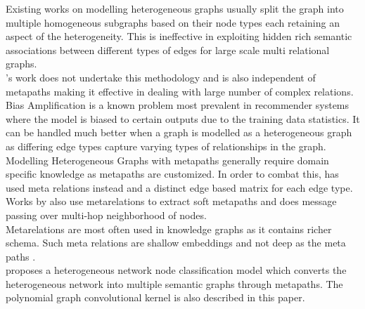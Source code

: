 \documentclass{report} %
\begin{document}
Existing works \cite{PR-HGNN-2024} on modelling heterogeneous graphs usually split the graph into multiple homogeneous subgraphs based on their node types each retaining an aspect of the heterogeneity.
This is ineffective in exploiting hidden rich semantic associations between different types of edges for large scale multi relational graphs. \\
\cite{RSHGNN-2019}'s work does not undertake this methodology and is also independent of metapaths making it effective in dealing with large number of complex relations.\\
Bias Amplification is a known problem most prevalent in recommender systems where the model is biased to certain outputs due to the training data statistics.
It can be handled much better when a graph  is modelled as a heterogeneous graph \cite{EV HGNN-2023} as differing edge types capture varying types of relationships in the graph. \\
Modelling Heterogeneous Graphs with metapaths generally require domain specific knowledge as metapaths are customized. 
In order to combat this, \cite{HGT-2022} has used meta relations instead and a distinct edge based matrix for each edge type.\\
Works by \cite{MHGNN-2023} also use metarelations to extract soft metapaths and does message passing over multi-hop neighborhood of nodes. \\
Metarelations are most often used in knowledge graphs as it contains richer schema. 
Such meta relations are shallow embeddings and not deep as the meta paths \cite{HGNN-2020}. \\

\cite{HNNC-2023} proposes a heterogeneous network node classification model which converts the heterogeneous network into multiple semantic graphs through metapaths. 
The polynomial graph convolutional kernel is also described in this paper.\\ 
\end{document}
